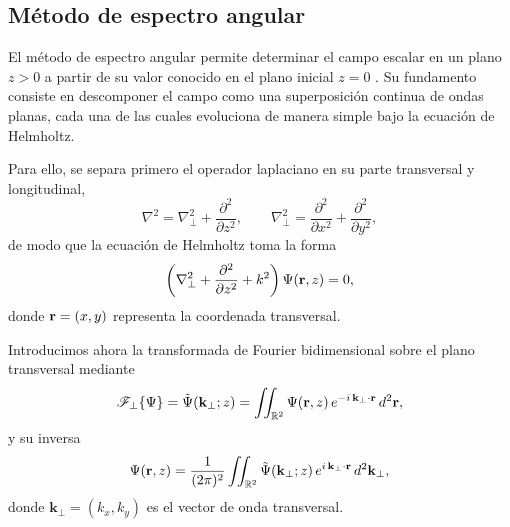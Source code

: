 \subsection{Método de espectro angular}

El método de espectro angular permite determinar el campo escalar en un plano $z>0$ a partir de su valor conocido en el plano inicial $z=0$ \cite{goodman2005}. Su fundamento consiste en descomponer el campo como una superposición continua de ondas planas, cada una de las cuales evoluciona de manera simple bajo la ecuación de Helmholtz.

Para ello, se separa primero el operador laplaciano en su parte transversal y longitudinal,
\begin{equation}
\nabla^2
=
\nabla_\perp^2
+
\frac{\partial^2}{\partial z^2},
\qquad
\nabla_\perp^2
=
\frac{\partial^2}{\partial x^2}
+
\frac{\partial^2}{\partial y^2},
\label{eq:laplacian_transverse_longitudinal}
\end{equation}
de modo que la ecuación de Helmholtz toma la forma
\begin{equation}
\left(
\nabla_\perp^2
+
\frac{\partial^2}{\partial z^2}
+
k^2
\right)
\Psi(\vb r,z)
=
0,
\label{eq:helmholtz_split}
\end{equation}
donde $\vb r=(x,y)$ representa la coordenada transversal.

Introducimos ahora la transformada de Fourier bidimensional sobre el plano transversal mediante
\begin{equation}
\mathscr F_\perp\{\Psi\}
=
\tilde{\Psi}(\mathbf k_\perp;z)
=
\iint_{\mathbb R^2}
\Psi(\vb r,z)\,
e^{-i\,\mathbf k_\perp\cdot\vb r}
\,d^2\vb r,
\label{eq:fourier_forward}
\end{equation}
y su inversa
\begin{equation}
\Psi(\vb r,z)
=
\frac{1}{(2\pi)^2}
\iint_{\mathbb R^2}
\tilde{\Psi}(\mathbf k_\perp;z)\,
e^{i\,\mathbf k_\perp\cdot\vb r}
\,d^2\mathbf k_\perp,
\label{eq:fourier_inverse}
\end{equation}
donde $\mathbf k_\perp=(k_x,k_y)$ es el vector de onda transversal.

